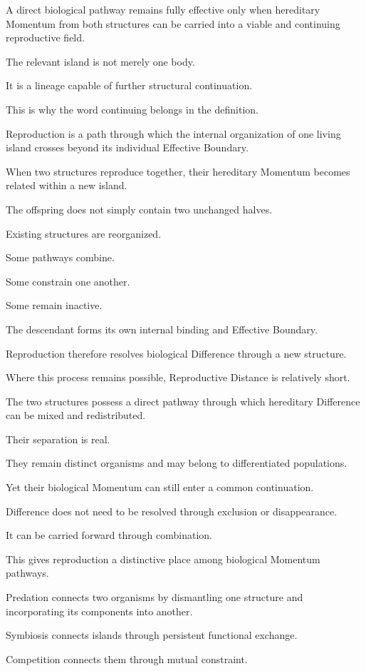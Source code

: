 A direct biological pathway remains fully effective only when hereditary Momentum from both structures can be carried into a viable and continuing reproductive field.

The relevant island is not merely one body.

It is a lineage capable of further structural continuation.

This is why the word continuing belongs in the definition.

Reproduction is a path through which the internal organization of one living island crosses beyond its individual Effective Boundary.

When two structures reproduce together, their hereditary Momentum becomes related within a new island.

The offspring does not simply contain two unchanged halves.

Existing structures are reorganized.

Some pathways combine.

Some constrain one another.

Some remain inactive.

The descendant forms its own internal binding and Effective Boundary.

Reproduction therefore resolves biological Difference through a new structure.

Where this process remains possible, Reproductive Distance is relatively short.

The two structures possess a direct pathway through which hereditary Difference can be mixed and redistributed.

Their separation is real.

They remain distinct organisms and may belong to differentiated populations.

Yet their biological Momentum can still enter a common continuation.

Difference does not need to be resolved through exclusion or disappearance.

It can be carried forward through combination.

This gives reproduction a distinctive place among biological Momentum pathways.

Predation connects two organisms by dismantling one structure and incorporating its components into another.

Symbiosis connects islands through persistent functional exchange.

Competition connects them through mutual constraint.


